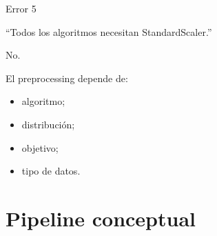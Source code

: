 \documentclass[aspectratio=169,11pt]{beamer}
\begin{document}

\begin{frame}{Error 5}

\begin{center}

\Large
``Todos los algoritmos necesitan StandardScaler.''
\end{center}

\vspace{0.5cm}

No.

El preprocessing depende de:

\begin{itemize}

    \item algoritmo;

    \item distribución;

    \item objetivo;

    \item tipo de datos.

\end{itemize}

\end{frame}

\section{Pipeline conceptual}
\end{document}
